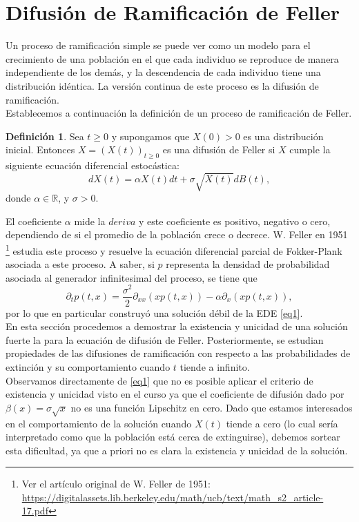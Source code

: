 \documentclass[letterpaper]{article}
\newcommand{\R}{\mathbb{R}}
\newcommand{\1}{\mathds{1}}
\theoremstyle{definition}
\newtheorem{dfn}{Definición}
\theoremstyle{definition}
\theoremstyle{definition}
\theoremstyle{definition}
\theoremstyle{definition}
\begin{document}
\section*{Difusión de Ramificación de Feller}
Un proceso de ramificación simple se puede ver como un modelo para el crecimiento de una población en el que 
cada individuo se reproduce de manera independiente de los demás, y la descendencia de cada 
individuo tiene una distribución idéntica. La versión continua de este proceso es la difusión de ramificación.\\

Establecemos a continuación la definición de un proceso de ramificación de Feller.
\begin{dfn}\label{eq1}
    Sea $t\geq0$ y supongamos que $X(0)>0$ es una distribución inicial. Entonces $X=(X(t))_{t\geq0}$ es una 
    difusión de Feller si $X$ cumple la siguiente ecuación diferencial estocástica:
    \[
    dX(t)=\alpha X(t)dt+\sigma\sqrt{X(t)}dB(t),
    \]
    donde $\alpha\in \R$, y $\sigma>0$.
\end{dfn}
El coeficiente $\alpha$ mide la $deriva$ y este coeficiente es positivo, negativo o cero, dependiendo de 
si el promedio de la población crece o decrece. W. Feller en 1951 \footnote[1]{Ver el artículo original
de W. Feller de 1951: \url{https://digitalassets.lib.berkeley.edu/math/ucb/text/math_s2_article-17.pdf}}
estudia este proceso y resuelve la ecuación diferencial parcial de Fokker-Plank asociada a este proceso. A saber, si $p$ representa la densidad de probabilidad
asociada al generador infinitesimal del proceso, se tiene que 
\[
\partial_t p(t,x)=\frac{\sigma^2}{2}\partial_{xx}(xp(t,x))-\alpha \partial_x(xp(t,x)), 
\]
por lo que en particular construyó una solución débil de la EDE \eqref{eq1}.\\

En esta sección procedemos a demostrar la existencia y unicidad de una solución fuerte la para la ecuación 
de difusión de Feller. Posteriormente, se estudian propiedades de las difusiones de ramificación con respecto 
a las probabilidades de extinción y su comportamiento cuando $t$ tiende a infinito.\\

Observamos directamente de \eqref{eq1} que no es posible aplicar el criterio de existencia y unicidad visto en el 
curso ya que el coeficiente de difusión dado por $\beta(x)=\sigma\sqrt{x}$ no es una función Lipschitz en 
cero. Dado que estamos interesados en el comportamiento de la solución cuando $X(t)$ tiende a cero (lo cual sería 
interpretado como que la población está cerca de extinguirse), debemos sortear esta dificultad, ya que 
a priori no es clara la existencia y unicidad de la solución.\\
\end{document}
